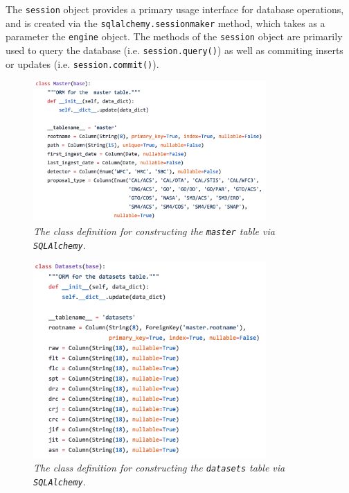 \documentclass[10pt,journal,compsoc]{IEEEtran}
\begin{document}
The \texttt{session} object provides a primary usage interface for database operations, and is created via the \texttt{sqlalchemy.sessionmaker} method, which takes as a parameter the
\texttt{engine} object.  The methods of the \texttt{session} object are primarily used to query the database (i.e. \texttt{session.query()}) as well as commiting inserts or updates (i.e.
\texttt{session.commit()}).

\begin{figure}[!h]
\centering
\includegraphics[width=3.5in]{./figures/master_table.png}
\caption{\textit{The class definition for constructing the \texttt{master} table via \texttt{SQLAlchemy}.}}
\label{fig13}
\end{figure}

\begin{figure}[!h]
\centering
\includegraphics[width=3.5in]{./figures/datasets_table.png}
\caption{\textit{The class definition for constructing the \texttt{datasets} table via \texttt{SQLAlchemy}.}}
\label{fig14}
\end{figure}
\end{document}

